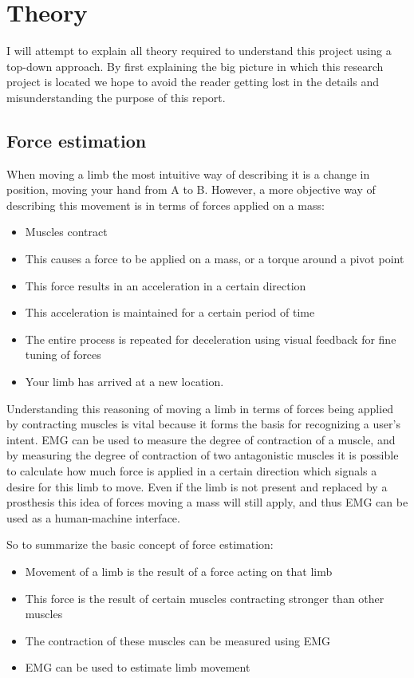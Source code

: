 \chapter{Theory}
I will attempt to explain all theory required to understand this project using a top-down approach. By first explaining the big picture in which this research project is located we hope to avoid the reader getting lost in the details and misunderstanding the purpose of this report. 

\section{Force estimation}
When moving a limb the most intuitive way of describing it is a change in position, moving your hand from A to B. However, a more objective way of describing this movement is in terms of forces applied on a mass:
\begin{itemize}
    \item Muscles contract
    \item This causes a force to be applied on a mass, or a torque around a pivot point
    \item This force results in an acceleration in a certain direction
    \item This acceleration is maintained for a certain period of time
    \item The entire process is repeated for deceleration using visual feedback for fine tuning of forces
    \item Your limb has arrived at a new location.
\end{itemize}

Understanding this reasoning of moving a limb in terms of forces being applied by contracting muscles is vital because it forms the basis for recognizing a user's intent. EMG can be used to measure the degree of contraction of a muscle, and by measuring the degree of contraction of two antagonistic muscles it is possible to calculate how much force is applied in a certain direction which signals a desire for this limb to move. Even if the limb is not present and replaced by a prosthesis this idea of forces moving a mass will still apply, and thus EMG can be used as a human-machine interface.

So to summarize the basic concept of force estimation:
\begin{itemize}
    \item Movement of a limb is the result of a force acting on that limb
    \item This force is the result of certain muscles contracting stronger than other muscles
    \item The contraction of these muscles can be measured using EMG
    \item EMG can be used to estimate limb movement
\end{itemize}

